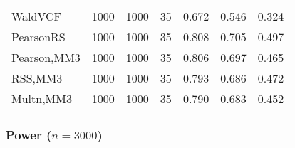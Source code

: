 \documentclass[
]{article}
\begin{document}
\begin{table}[H]
{\begin{tabular}[t]{lrrrrrr}
\hspace{1em}WaldVCF & 1000 & 1000 & 35 & 0.672 & 0.546 & 0.324\\
\hspace{1em}PearsonRS & 1000 & 1000 & 35 & 0.808 & 0.705 & 0.497\\
\hspace{1em}Pearson,MM3 & 1000 & 1000 & 35 & 0.806 & 0.697 & 0.465\\
\hspace{1em}RSS,MM3 & 1000 & 1000 & 35 & 0.793 & 0.686 & 0.472\\
\hspace{1em}Multn,MM3 & 1000 & 1000 & 35 & 0.790 & 0.683 & 0.452\\
\bottomrule
\end{tabular}}
\endgroup{}
\end{table}

\hypertarget{power-n3000-1}{%
\subsubsection{\texorpdfstring{Power
(\(n=3000\))}{Power (n=3000)}}\label{power-n3000-1}}
\end{document}
